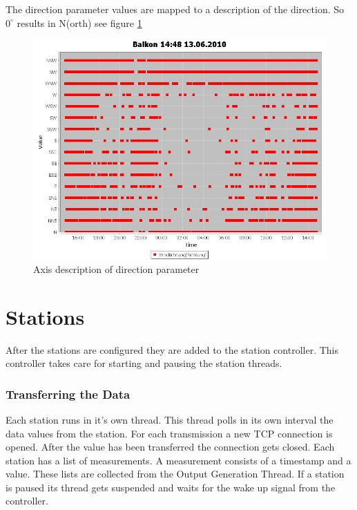 The direction parameter values are mapped to a description of the direction. So $0^\circ$ results in N(orth) see figure \ref{fig:dir}
\begin{figure}[ht]
    \centering
    \includegraphics[width=0.9\linewidth]{master/plot_dir.png}
    \caption{Axis description of direction parameter}
    \label{fig:dir}
\end{figure}

\section{Stations} %
\label{sec:stations}

After the stations are configured they are added to the station controller. This controller takes care for starting and pausing the station threads. 

\subsubsection{Transferring the Data} %
\label{ssub:getting_the_data}
Each station runs in it's own thread. This thread polls in its own interval the data values from the station. For each transmission a new TCP connection is opened. After the value has been transferred the connection gets closed. Each station has a list of measurements. A measurement consists of a timestamp and a value. These lists are collected from the Output Generation Thread. If a station is paused its thread gets suspended and waits for the wake up signal from the controller. 

